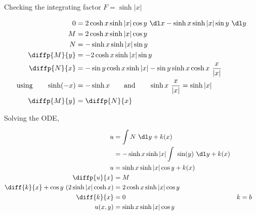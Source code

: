 \begin{enumerate}
          Checking the integrating factor $ F = \sinh |x| $

          \begin{align}
              0                             & =2 \cosh x \sinh |x| \cos y\ \dl x - \sinh x \sinh |x| \sin y \ \dl y  \\
              M                             & = 2 \cosh x \sinh |x| \cos y                                           \\
              N                             & =  - \sinh x \sinh |x| \sin y                                          \\
              \diffp{M}{y}                  & = -2 \cosh x \sinh |x| \sin y                                          \\
              \diffp{N}{x}                  & = -\sin y \cosh x \sinh |x| - \sin y \sinh x \cosh x \ \frac{x}{|x|}   \\
              \text{using} \qquad \sinh(-x) & = -\sinh x \qquad \text{and} \qquad \sinh x\ \frac{x}{|x|} = \sinh |x| \\
              \diffp{M}{y}                  & = \diffp{N}{x}
          \end{align}

          Solving the ODE,

          \begin{align}
              u                                            & = \int N\ \dl y+ k(x)                                     \\
                                                           & = -\sinh x \sinh |x| \int\ \sin(y)\ \dl y+ k(x)           \\
              u                                            & = \sinh x \sinh |x| \cos y + k(x)                         \\
              \diffp{u}{x}                                 & = M                                                       \\
              \diff{k}{x} + \cos y \ (2 \sinh |x| \cosh x) & = 2 \cosh x \sinh |x| \cos y                              \\
              \diff{k}{x}                                  & = 0                                             & k & = b \\
              u(x, y)                                      & = \sinh x \sinh |x| \cos y
          \end{align}



\end{enumerate}
